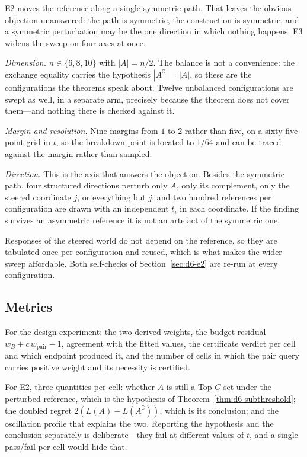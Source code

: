 \documentclass[conference]{IEEEtran}
\theoremstyle{definition}
\begin{document}
E2 moves the reference along a single symmetric path. That leaves the obvious objection
unanswered: the path is symmetric, the construction is symmetric, and a symmetric
perturbation may be the one direction in which nothing happens. E3 widens the sweep on four
axes at once.

\emph{Dimension.} $n\in\{6,8,10\}$ with $|A|=n/2$. The balance is not a convenience: the
exchange equality carries the hypothesis $|A^{\complement}|=|A|$, so these are the
configurations the theorems speak about. Twelve unbalanced configurations are swept as well,
in a separate arm, precisely because the theorem does not cover them---and nothing there is
checked against it.

\emph{Margin and resolution.} Nine margins from $1$ to $2$ rather than five, on a
sixty-five-point grid in $t$, so the breakdown point is located to $1/64$ and can be traced
against the margin rather than sampled.

\emph{Direction.} This is the axis that answers the objection. Besides the symmetric path,
four structured directions perturb only $A$, only its complement, only the steered coordinate
$j$, or everything but $j$; and two hundred references per configuration are drawn with an
independent $t_{i}$ in each coordinate. If the finding survives an asymmetric reference it is
not an artefact of the symmetric one.

Responses of the steered world do not depend on the reference, so they are tabulated once per
configuration and reused, which is what makes the wider sweep affordable. Both self-checks of
Section~\ref{sec:d6-e2} are re-run at every configuration.

\subsection{Metrics}

For the design experiment: the two derived weights, the budget residual
$w_{B}+c\,w_{\mathrm{pair}}-1$, agreement with the fitted values, the certificate verdict per
cell and which endpoint produced it, and the number of cells in which the pair query carries
positive weight and its necessity is certified.

For E2, three quantities per cell: whether $A$ is still a Top-$C$ set under the perturbed
reference, which is the hypothesis of Theorem~\ref{thm:d6-subthreshold}; the doubled regret
$2(L(A)-L(A^{\complement}))$, which is its conclusion; and the oscillation profile that
explains the two. Reporting the hypothesis and the conclusion separately is deliberate---they
fail at different values of $t$, and a single pass/fail per cell would hide that.
\end{document}
